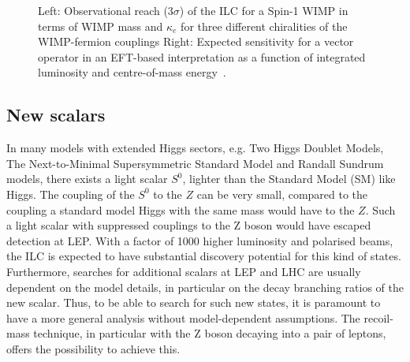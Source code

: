 \begin{figure}[]
\setlength{\unitlength}{1.0cm}
\hspace{0.05cm}
\caption{\label{fig:searches_WIMPs} Left: Observational reach ($3\sigma$) of the ILC for a Spin-1 
  WIMP in terms of WIMP
  mass and $\kappa_e$ for three different chiralities of the WIMP-fermion couplings
   Right: Expected sensitivity for a vector operator in an EFT-based interpretation as a function of integrated
  luminosity and centre-of-mass energy~\cite{Habermehl:417605}.}
\end{figure}

\subsection{New scalars}
\label{subsec:searches_newscalars}

In many models with extended Higgs sectors, e.g.
Two Higgs Doublet Models, The Next-to-Minimal Supersymmetric  Standard  Model
and  Randall  Sundrum  models,  there  exists  a  light  scalar
$S^0$,
lighter than the Standard Model (SM) like Higgs.
The coupling of the $S^0$ to the $Z$ can be very small,
compared to the coupling a standard model Higgs with the
same mass would have
to the $Z$.
Such a light scalar with suppressed couplings to the Z boson would
have escaped detection at LEP.
With a factor of 1000 higher luminosity and polarised beams,
the ILC is expected to have substantial discovery potential for
this kind of states.
Furthermore,
searches for additional scalars at LEP and LHC are usually dependent on the
model details,
in particular on the decay branching ratios of the new scalar.
Thus, to be able to search for such new states,
it is paramount to have a more general analysis without
model-dependent assumptions.
The recoil-mass technique,
in particular with the Z boson decaying into a pair of leptons,
offers the possibility to achieve this.

